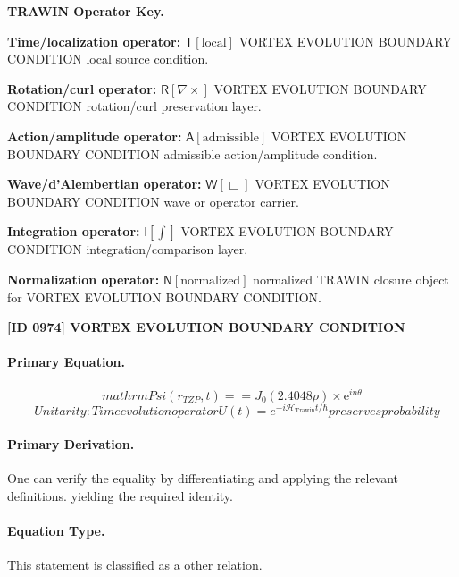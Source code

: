 \par\vspace{0.45\baselineskip}
\noindent\begin{minipage}[t]{\linewidth}
\begingroup
\small
\raggedright
\textbf{TRAWIN Operator Key.}\par
\noindent\textbf{Time/localization operator:} $\mathsf{T}\!\left[\mathrm{local}\right]$ VORTEX EVOLUTION BOUNDARY CONDITION local source condition.\par
\noindent\textbf{Rotation/curl operator:} $\mathsf{R}\!\left[\nabla\times\right]$ VORTEX EVOLUTION BOUNDARY CONDITION rotation/curl preservation layer.\par
\noindent\textbf{Action/amplitude operator:} $\mathsf{A}\!\left[\mathrm{admissible}\right]$ VORTEX EVOLUTION BOUNDARY CONDITION admissible action/amplitude condition.\par
\noindent\textbf{Wave/d'Alembertian operator:} $\mathsf{W}\!\left[\Box\right]$ VORTEX EVOLUTION BOUNDARY CONDITION wave or operator carrier.\par
\noindent\textbf{Integration operator:} $\mathsf{I}\!\left[\int\right]$ VORTEX EVOLUTION BOUNDARY CONDITION integration/comparison layer.\par
\noindent\textbf{Normalization operator:} $\mathsf{N}\!\left[\mathrm{normalized}\right]$ normalized TRAWIN closure object for VORTEX EVOLUTION BOUNDARY CONDITION.\par
\endgroup
\end{minipage}

\clearpage
\noindent\textbf{[ID 0974] VORTEX EVOLUTION BOUNDARY CONDITION}\par
\vspace{0.35em}
\paragraph{Primary Equation.}
\[
mathrm{Psi}(r_{TZP}, t) == J_0(2.4048 \rho) \times \mathrm{e}^{i n \theta}
\]
\[
- Unitarity: Time evolution operator U(t) = e^{-i\mathcal{H}_{\mathrm{Trawin}} t/\hbar} preserves probability
\]

\paragraph{Primary Derivation.}
One can verify the equality by differentiating and applying the relevant definitions. yielding the required identity.
\paragraph{Equation Type.}
This statement is classified as a other relation.

